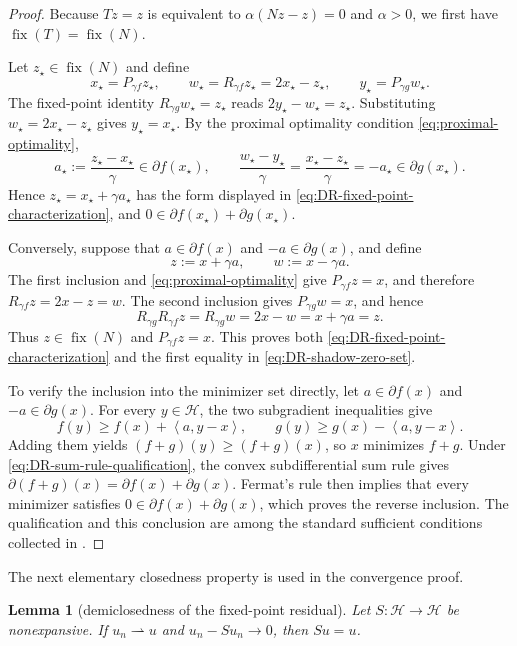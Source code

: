 \documentclass[10pt,leqno]{amsart}
\numberwithin{equation}{section}
\numberwithin{algorithm}{section}
\newtheorem{lemma}[theorem]{Lemma}
\theoremstyle{remark}
\newcommand{\Hcal}{\mathcal{H}}
\newcommand{\Fix}{\operatorname{fix}}
\newcommand{\subd}{\partial}
\newcommand{\ip}[2]{\left\langle #1,#2 \right\rangle}
\begin{document}
\begin{proof}
Because $Tz=z$ is equivalent to $\alpha(Nz-z)=0$ and $\alpha>0$, we first have $\Fix(T)=\Fix(N)$.

Let $z_\star\in\Fix(N)$ and define
\[
  x_\star=P_{\gamma f}z_\star,
  \qquad
  w_\star=R_{\gamma f}z_\star=2x_\star-z_\star,
  \qquad
  y_\star=P_{\gamma g}w_\star.
\]
The fixed-point identity $R_{\gamma g}w_\star=z_\star$ reads
$2y_\star-w_\star=z_\star$.  Substituting
$w_\star=2x_\star-z_\star$ gives $y_\star=x_\star$.
By the proximal optimality condition \eqref{eq:proximal-optimality},
\begin{equation}
\label{eq:DR-fixed-point-subgradients}
  a_\star:=\frac{z_\star-x_\star}{\gamma}
  \in\subd f(x_\star),
  \qquad
  \frac{w_\star-y_\star}{\gamma}
  =\frac{x_\star-z_\star}{\gamma}
  =-a_\star
  \in\subd g(x_\star).
\end{equation}
Hence $z_\star=x_\star+\gamma a_\star$ has the form displayed in \eqref{eq:DR-fixed-point-characterization}, and
$0\in\subd f(x_\star)+\subd g(x_\star)$.

Conversely, suppose that $a\in\subd f(x)$ and $-a\in\subd g(x)$, and define
\[
  z:=x+\gamma a,
  \qquad
  w:=x-\gamma a.
\]
The first inclusion and \eqref{eq:proximal-optimality} give $P_{\gamma f}z=x$, and therefore $R_{\gamma f}z=2x-z=w$.  The second inclusion gives $P_{\gamma g}w=x$, and hence
\[
  R_{\gamma g}R_{\gamma f}z
  =R_{\gamma g}w
  =2x-w
  =x+\gamma a
  =z.
\]
Thus $z\in\Fix(N)$ and $P_{\gamma f}z=x$.  This proves both \eqref{eq:DR-fixed-point-characterization} and the first equality in \eqref{eq:DR-shadow-zero-set}.

To verify the inclusion into the minimizer set directly, let
$a\in\subd f(x)$ and $-a\in\subd g(x)$.  For every $y\in\Hcal$, the two subgradient inequalities give
\[
  f(y)\ge f(x)+\ip a{y-x},
  \qquad
  g(y)\ge g(x)-\ip a{y-x}.
\]
Adding them yields $(f+g)(y)\ge(f+g)(x)$, so $x$ minimizes $f+g$.
Under \eqref{eq:DR-sum-rule-qualification}, the convex subdifferential sum rule gives
$\subd(f+g)(x)=\subd f(x)+\subd g(x)$.  Fermat's rule then implies that every minimizer satisfies
$0\in\subd f(x)+\subd g(x)$, which proves the reverse inclusion.  The qualification and this conclusion are among the standard sufficient conditions collected in \cite[Cor.~27.6]{BauschkeCombettes2017}.
\end{proof}

The next elementary closedness property is used in the convergence proof.

\begin{lemma}[demiclosedness of the fixed-point residual]
\label{lem:demiclosedness}
Let $S:\Hcal\to\Hcal$ be nonexpansive.  If $u_n\rightharpoonup u$ and
$u_n-Su_n\to0$, then $Su=u$.
\end{lemma}
\end{document}
